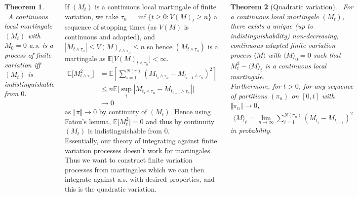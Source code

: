 \documentclass{tikzposter} %
\newtheorem{theorem}{Theorem}
\begin{document}
\begin{columns}
{    \begin{theorem}
    \ A continuous local martingale $(M_{t})$ with $M_{0} = 0$ a.s. is a process of finite variation iff $(M_{t})$ is indistinguishable from $0$.
    \end{theorem}
    \hphantom{}

    If $(M_{t})$ is a continuous local martingale of finite variation, we take $\tau_{n} = \inf \{t \ge 0 : V(M)_{t} \ge n\}$ a sequence of stopping times (as $V(M)$ is continuous and adapted), and $|M_{t \land \tau_{n}}| \le V(M)_{t\land \tau_{n}} \le n$ so hence $(M_{t \land \tau_{n}})$ is a martingale as $\mathbb{E}\big[V(M)_{t \land \tau_{n}}\big] < \infty$.
    \begin{align*}
      \mathbb{E}\big[M_{t \land \tau_{n}}^{2}\big] &= \mathbb{E}\left[\sum_{i=1}^{N(\pi)} (M_{t_{i} \land \tau_{n}} - M_{t_{i-1} \land \tau_{n}})^{2}\right] \\
                                                   &\le n \mathbb{E}\big[\sup_{i} |M_{t_{i} \land \tau_{n}} - M_{t_{i-1} \land \tau_{n}}|\big] \\
      &\to 0
    \end{align*}
    as $\Vert \pi \Vert \to 0$ by continuity of $(M_{t})$. Hence using Fatou's lemma, $\mathbb{E}\big[M^{2}_{t}\big] = 0$ and thus by continuity $(M_{t})$ is indistinguishable from $0$. \\

    Essentially, our theory of integrating against finite variation processes doesn't work for martingales. Thus we want to construct finite variation processes from martingales which we can then integrate against a.s. with desired properties, and this is the quadratic variation. \\

    \begin{theorem}[Quadratic variation]
      \ For a continuous local martingale $(M_{t})$, there exists a unique (up to indistinguishability) non-decreasing, continuous adapted finite variation process $\langle M \rangle$ with $\langle M \rangle_{0} = 0$ such that $M^{2}_{t} - \langle M \rangle_{t}$ is a continuous local martingale. \\

      Furthermore, for $t > 0$, for any sequence of partitions $(\pi_{n})$ on $[0,t]$ with $\Vert \pi_{n} \Vert \to 0$,
    \begin{align*}
      \langle M \rangle_{t} = \lim_{n \to \infty} \sum_{i=1}^{N(\pi_{n})} (M_{t_{i}} - M_{t_{i-1}})^{2}
    \end{align*}
    in probability.
    \end{theorem}
    \hphantom{}

}
\end{columns}
\end{document}
